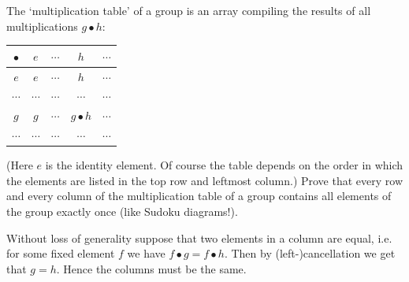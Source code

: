 \documentclass[12pt,letterpaper,boxed]{hmcpset}
\begin{document}
\begin{problem}[1.5]
	The `multiplication table' of a group is an array compiling the results of all
	multiplications $g \bullet h$:
\begin{center}
\begin{tabular}{c||c|c|c|c}
	
	$\bullet$ & $e$ & $\cdots$ & $h$ & $\cdots$ \\ \hline \hline
	$e$ & $e$ & $\cdots$ & $h$ & $\cdots$ \\ \hline
	$\cdots$ & $\cdots$ & $\cdots$ & $\cdots$ & $\cdots$ \\ \hline
	$g$ & $g$ & $\cdots$ & $g\bullet h$ & $\cdots$ \\ \hline
	$\cdots$ & $\cdots$ & $\cdots$ & $\cdots$ & $\cdots$ \\ 
\end{tabular}
\end{center}
	(Here $e$ is the identity element. Of course the table depends on the order in
	which the elements are listed in the top row and leftmost column.) Prove that
	every row and every column of the multiplication table of a group contains all
	elements of the group exactly once (like Sudoku diagrams!).
\end{problem}
\begin{solution}
	Without loss of generality suppose that two elements in a column are equal,
	i.e. for some fixed element $f$ we have $f\bullet g = f\bullet h$. Then by
	(left-)cancellation we get that $g=h$. Hence the columns must be the same.
\end{solution}
\end{document}
